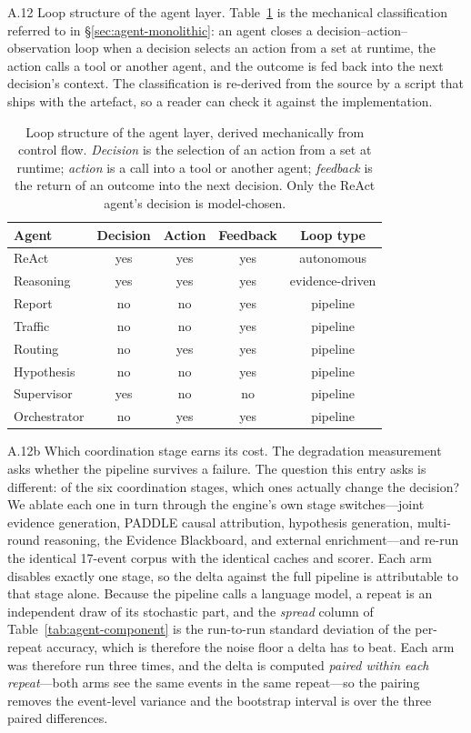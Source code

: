 A.12 Loop structure of the agent layer.\label{app:agent-appendix}
Table~\ref{tab:agent-loops} is the
mechanical classification referred to in \S\ref{sec:agent-monolithic}: an
agent closes a decision--action--observation loop when a decision selects
an action from a set at runtime, the action calls a tool or another
agent, and the outcome is fed back into the next decision's context.  The
classification is re-derived from the source by a script that ships with
the artefact, so a reader can check it against the implementation.
\begin{table}[!htbp]
\centering
\caption{Loop structure of the agent layer, derived mechanically from
control flow. \emph{Decision} is the selection of an action from a set at
runtime; \emph{action} is a call into a tool or another agent;
\emph{feedback} is the return of an outcome into the next decision.
Only the ReAct agent's decision is model-chosen.}
\label{tab:agent-loops}
\small
\setlength{\tabcolsep}{4pt}
\begin{tabular}{@{}lcccc@{}}
\hline
\textbf{Agent} & \textbf{Decision} & \textbf{Action} & \textbf{Feedback}
  & \textbf{Loop type} \\
\hline
ReAct            & yes & yes & yes & autonomous \\
Reasoning        & yes & yes & yes & evidence-driven \\
Report           & no  & no  & yes & pipeline \\
Traffic         & no  & no  & yes & pipeline \\
Routing         & no  & yes & yes & pipeline \\
Hypothesis       & no  & no  & yes & pipeline \\
Supervisor      & yes & no  & no  & pipeline \\
Orchestrator     & no  & yes & yes & pipeline \\
\hline
\end{tabular}
\end{table}

A.12b Which coordination stage earns its cost.\label{app:agent-ablation}
The degradation measurement asks whether the pipeline survives a failure.
The question this entry asks is different: of the six coordination
stages, which ones actually change the decision? We ablate each one in
turn through the engine's own stage switches---joint evidence generation,
PADDLE causal attribution, hypothesis generation, multi-round reasoning, the
Evidence Blackboard, and external enrichment---and re-run the identical
17-event corpus with the identical caches and scorer. Each arm disables
exactly one stage, so the delta against the full pipeline is attributable
to that stage alone. Because the pipeline calls a language model, a repeat
is an independent draw of its stochastic part, and the \emph{spread} column
of Table~\ref{tab:agent-component} is the run-to-run standard deviation of
the per-repeat accuracy, which is therefore the noise floor a delta has to
beat. Each arm was therefore run three times, and the delta is computed
\emph{paired within each repeat}---both arms see the same events in the
same repeat---so the pairing removes the event-level variance and the
bootstrap interval is over the three paired differences.


